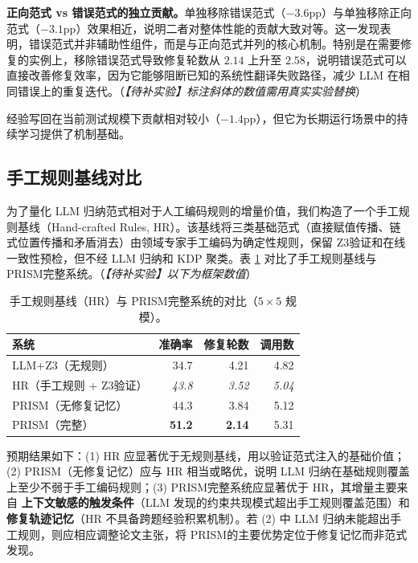 \documentclass[UTF8,a4paper,12pt]{ctexart}
\newcommand{\PRISM}{PRISM}
\newcommand{\zthree}{Z3}
\begin{document}
\textbf{正向范式 vs 错误范式的独立贡献。}单独移除错误范式（\(-3.6\)pp）与单独移除正向范式（\(-3.1\)pp）效果相近，说明二者对整体性能的贡献大致对等。这一发现表明，错误范式并非辅助性组件，而是与正向范式并列的核心机制。特别是在需要修复的实例上，移除错误范式导致修复轮数从 \(2.14\) 上升至 \(2.58\)，说明错误范式可以直接改善修复效率，因为它能够阻断已知的系统性翻译失败路径，减少 LLM 在相同错误上的重复迭代。（\textit{【待补实验】标注\textit{斜体}的数值需用真实实验替换}）

经验写回在当前测试规模下贡献相对较小（\(-1.4\)pp），但它为长期运行场景中的持续学习提供了机制基础。

\subsection{手工规则基线对比}

为了量化 LLM 归纳范式相对于人工编码规则的增量价值，我们构造了一个手工规则基线（Hand-crafted Rules, HR）。该基线将三类基础范式（直接赋值传播、链式位置传播和矛盾消去）由领域专家手工编码为确定性规则，保留 \zthree 验证和在线一致性预检，但不经 LLM 归纳和 KDP 聚类。表 \ref{tab:handcraft} 对比了手工规则基线与 \PRISM 完整系统。（\textit{【待补实验】以下为框架数值}）

\begin{table}[t]
  \centering
  \caption{手工规则基线（HR）与 \PRISM 完整系统的对比（\(5\times5\) 规模）。}
  \label{tab:handcraft}
  \begin{tabular}{lrrr}
    \toprule
    系统 & 准确率 & 修复轮数 & 调用数 \\
    \midrule
    LLM+\zthree（无规则） & 34.7 & 4.21 & 4.82 \\
    HR（手工规则 + \zthree 验证） & \textit{43.8} & \textit{3.52} & \textit{5.04} \\
    \PRISM（无修复记忆） & 44.3 & 3.84 & 5.12 \\
    \PRISM（完整） & \textbf{51.2} & \textbf{2.14} & 5.31 \\
    \bottomrule
  \end{tabular}
\end{table}

预期结果如下：(1) HR 应显著优于无规则基线，用以验证范式注入的基础价值；(2) \PRISM（无修复记忆）应与 HR 相当或略优，说明 LLM 归纳在基础规则覆盖上至少不弱于手工编码规则；(3) \PRISM 完整系统应显著优于 HR，其增量主要来自 \textbf{上下文敏感的触发条件}（LLM 发现的约束共现模式超出手工规则覆盖范围）和\textbf{修复轨迹记忆}（HR 不具备跨题经验积累机制）。若 (2) 中 LLM 归纳未能超出手工规则，则应相应调整论文主张，将 \PRISM 的主要优势定位于修复记忆而非范式发现。
\end{document}

